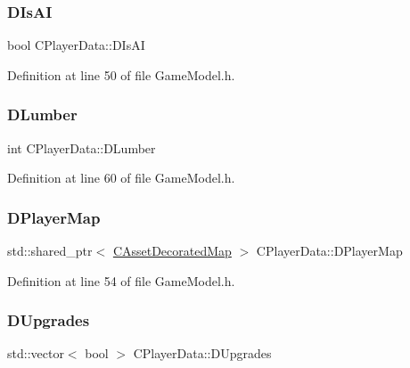 \subsubsection{\texorpdfstring{D\+Is\+AI}{DIsAI}}
{\footnotesize\ttfamily bool C\+Player\+Data\+::\+D\+Is\+AI\hspace{0.3cm}{\ttfamily [protected]}}



Definition at line 50 of file Game\+Model.\+h.

\hypertarget{classCPlayerData_adf3bf2fa49b5c8a4fb9a478d95f688c4}{}\label{classCPlayerData_adf3bf2fa49b5c8a4fb9a478d95f688c4} 
\subsubsection{\texorpdfstring{D\+Lumber}{DLumber}}
{\footnotesize\ttfamily int C\+Player\+Data\+::\+D\+Lumber\hspace{0.3cm}{\ttfamily [protected]}}



Definition at line 60 of file Game\+Model.\+h.

\hypertarget{classCPlayerData_a452163191cd4603e1e38dd8d4bb9691c}{}\label{classCPlayerData_a452163191cd4603e1e38dd8d4bb9691c} 
\subsubsection{\texorpdfstring{D\+Player\+Map}{DPlayerMap}}
{\footnotesize\ttfamily std\+::shared\+\_\+ptr$<$ \hyperlink{classCAssetDecoratedMap}{C\+Asset\+Decorated\+Map} $>$ C\+Player\+Data\+::\+D\+Player\+Map\hspace{0.3cm}{\ttfamily [protected]}}



Definition at line 54 of file Game\+Model.\+h.

\hypertarget{classCPlayerData_ae7cb90c31ec46b65ba88485368a4b96a}{}\label{classCPlayerData_ae7cb90c31ec46b65ba88485368a4b96a} 
\subsubsection{\texorpdfstring{D\+Upgrades}{DUpgrades}}
{\footnotesize\ttfamily std\+::vector$<$ bool $>$ C\+Player\+Data\+::\+D\+Upgrades\hspace{0.3cm}{\ttfamily [protected]}}




